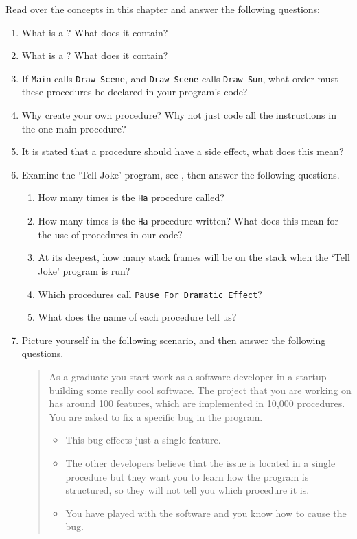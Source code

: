 Read over the concepts in this chapter and answer the following questions:
\begin{enumerate}
  \item What is a ? What does it contain?
  \item What is a ? What does it contain?
  \item If \texttt{Main} calls \texttt{Draw Scene}, and \texttt{Draw Scene} calls \texttt{Draw Sun}, what order must these procedures be declared in your program's code?
  \item Why create your own procedure? Why not just code all the instructions in the one main procedure?
  \item It is stated that a procedure should have a side effect, what does this mean?
  \item Examine the `Tell Joke' program, see , then answer the following questions.
  \begin{enumerate}
    \item How many times is the \texttt{Ha} procedure called?
    \item How many times is the \texttt{Ha} procedure written? What does this mean for the use of procedures in our code?
    \item At its deepest, how many stack frames will be on the stack when the `Tell Joke' program is run?
    \item Which procedures call \texttt{Pause For Dramatic Effect}?
    \item What does the name of each procedure tell us?
  \end{enumerate}
  \item Picture yourself in the following scenario, and then answer the following questions.
  \begin{quote}
    As a graduate you start work as a software developer in a startup building some really cool software. The project that you are working on has around 100 features, which are implemented in 10,000 procedures. You are asked to fix a specific bug in the program. 
    \begin{itemize}
      \item This bug effects just a single feature. 
      \item The other developers believe that the issue is located in a single procedure but they want you to learn how the program is structured, so they will not tell you which procedure it is. 
      \item You have played with the software and you know how to cause the bug.

\end{itemize}
\end{quote}
\end{enumerate}
